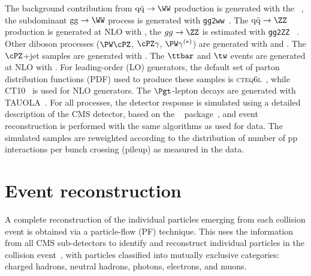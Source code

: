 The background contribution from $\rm{q\bar{q}} \to \WW$ production is generated
with the \MADGRAPH~\cite{Alwall:2007st},
the subdominant $\mathrm{gg} \to \WW$ process
is generated 
with {\tt gg2ww}~\cite{ggww}.
The $\rm{q\bar{q}} \to \ZZ$ production is generated at 
NLO with 
\POWHEG,
the $gg \rightarrow \ZZ $ 
is estimated 
with {\tt gg2ZZ} ~\cite{Binoth:2008pr}.
Other diboson processes ($\PW\cPZ$, $\cPZ\gamma$, $\PW\gamma^{(*)}$) are generated with \PYTHIA and 
\MADGRAPH.
The $\cPZ$+jet samples 
are generated with \MADGRAPH. The $\ttbar$ and $\tw$ events are generated at NLO with 
\POWHEG.
For leading-order (LO) generators, the default 
set of parton distribution functions
(PDF) used to produce these samples is \textsc{cteq6l}~\cite{CTEQ66}, while
\textsc{CT10}~\cite{ct10} is used for NLO generators.
The $\Pgt$-lepton decays are generated with \textsc{TAUOLA}~\cite{Jadach:1993hs}.
For all processes, the detector response is simulated using a detailed
description of the CMS detector, based on the \GEANTfour~
package~\cite{GEANT}, and event reconstruction is performed with
the same algorithms as used for data.
The simulated samples are reweighted according to the distribution of number of pp interactions
per bunch crossing (pileup) as measured in the data.

\section{Event reconstruction}
\label{sec:reconstruction}

A complete reconstruction of the individual particles emerging from
each collision event is obtained via a particle-flow (PF) technique.
This uses the information from all CMS sub-detectors to identify and
reconstruct individual particles in the collision
event~\cite{CMS-PAS-PFT-09-001, CMS-PAS-PFT-10-002}, with particles
classified into mutually exclusive categories: charged hadrons,
neutral hadrons, photons, electrons, and muons.
%

